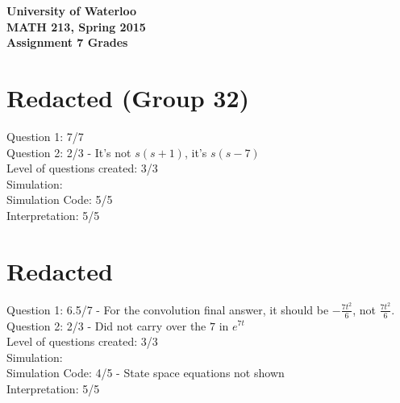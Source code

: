 \documentclass[12pt]{article}
\begin{document}
\begin{center}
{\Large\bf University of Waterloo}\\
\vspace{3mm}
{\Large\bf MATH 213, Spring 2015}\\
\vspace{2mm}
{\Large\bf Assignment 7 Grades}\\
\end{center}

\section*{Redacted (Group 32)}

Question 1: 7/7 \\
Question 2: 2/3 - It's not $s(s + 1)$, it's $s(s - 7)$ \\

\noindent Level of questions created: 3/3 \\

\noindent Simulation: \\
\indent Simulation Code: 5/5 \\
\indent Interpretation: 5/5

\section*{Redacted}

Question 1: 6.5/7 - For the convolution final answer, it should be $-\frac{7t^2}{6}$, not $\frac{7t^2}{6}$. \\
Question 2: 2/3 - Did not carry over the $7$ in $e^{7t}$\\

\noindent Level of questions created: 3/3 \\

\noindent Simulation: \\
\indent Simulation Code: 4/5 - State space equations not shown \\
\indent Interpretation: 5/5
\end{document}
